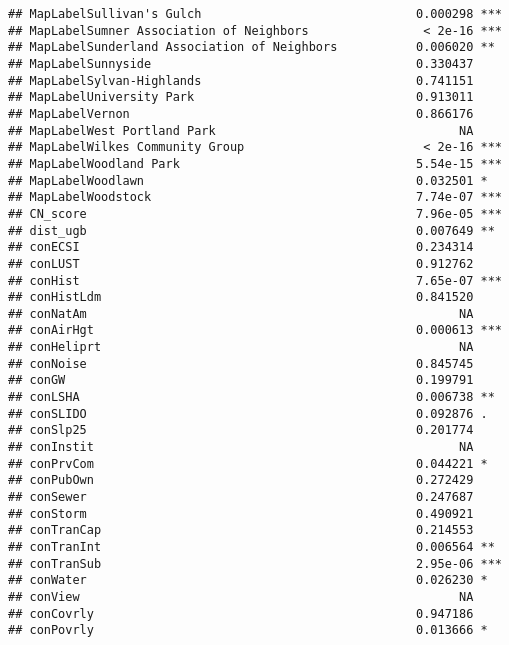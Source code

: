 \documentclass[]{article}
\begin{document}
\begin{verbatim}
## MapLabelSullivan's Gulch                              0.000298 ***
## MapLabelSumner Association of Neighbors                < 2e-16 ***
## MapLabelSunderland Association of Neighbors           0.006020 ** 
## MapLabelSunnyside                                     0.330437    
## MapLabelSylvan-Highlands                              0.741151    
## MapLabelUniversity Park                               0.913011    
## MapLabelVernon                                        0.866176    
## MapLabelWest Portland Park                                  NA    
## MapLabelWilkes Community Group                         < 2e-16 ***
## MapLabelWoodland Park                                 5.54e-15 ***
## MapLabelWoodlawn                                      0.032501 *  
## MapLabelWoodstock                                     7.74e-07 ***
## CN_score                                              7.96e-05 ***
## dist_ugb                                              0.007649 ** 
## conECSI                                               0.234314    
## conLUST                                               0.912762    
## conHist                                               7.65e-07 ***
## conHistLdm                                            0.841520    
## conNatAm                                                    NA    
## conAirHgt                                             0.000613 ***
## conHeliprt                                                  NA    
## conNoise                                              0.845745    
## conGW                                                 0.199791    
## conLSHA                                               0.006738 ** 
## conSLIDO                                              0.092876 .  
## conSlp25                                              0.201774    
## conInstit                                                   NA    
## conPrvCom                                             0.044221 *  
## conPubOwn                                             0.272429    
## conSewer                                              0.247687    
## conStorm                                              0.490921    
## conTranCap                                            0.214553    
## conTranInt                                            0.006564 ** 
## conTranSub                                            2.95e-06 ***
## conWater                                              0.026230 *  
## conView                                                     NA    
## conCovrly                                             0.947186    
## conPovrly                                             0.013666 *  

\end{verbatim}
\end{document}

